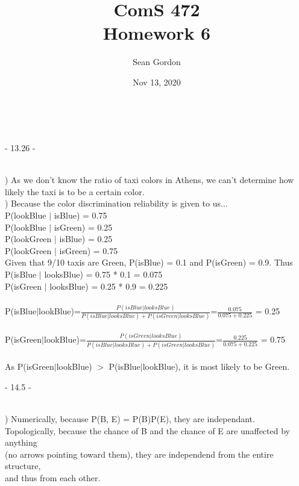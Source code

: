 \documentclass[12pt]{article}
\title{ComS 472\\Homework 6}
\author{Sean Gordon}
\date{Nov 13, 2020}
\begin{document}
\maketitle

\ \\
\centerline{- 13.26 - }
\ \\
) As we don't know the ratio of taxi colors in Athens, we can't determine how likely the taxi is to be a certain color.\\

) Because the color discrimination reliability is given to us...\\
\indent P(lookBlue $|$ isBlue) = 0.75\\
\indent P(lookBlue $|$ isGreen) = 0.25\\
\indent P(lookGreen $|$ isBlue) = 0.25\\
\indent P(lookGreen $|$ isGreen) = 0.75\\[0.4em]
\indent Given that 9/10 taxis are Green, P(isBlue) = 0.1 and P(isGreen) = 0.9. Thus\\[.4em]
\indent P(isBlue $|$ looksBlue) = 0.75 * 0.1 = 0.075\\
\indent P(isGreen $|$ looksBlue) = 0.25 * 0.9 = 0.225\\\\
\indent P(isBlue$|$lookBlue)={\Large $\frac{P(isBlue | looksBlue)}{P(isBlue | looksBlue) +  P(isGreen | looksBlue)}$}={\Large $\frac{0.075}{0.075 + 0.225}$} = 0.25\\\\
\indent P(isGreen$|$lookBlue)={\Large $\frac{P(isGreen | looksBlue)}{P(isBlue | looksBlue) +  P(isGreen | looksBlue)}$}={\Large $\frac{0.225}{0.075 + 0.225}$} = 0.75\\\\
\indent As P(isGreen$|$lookBlue) $>$ P(isBlue$|$lookBlue), it is most likely to be Green.\\



\noindent \hrulefill \pagebreak



\centerline{- 14.5 - }
\ \\
) Numerically, because P(B, E) = P(B)P(E), they are independant.\\[.4em]
\indent Topologically, because the chance of B and the chance of E are unaffected by anything \\
\indent (no arrows pointing toward them), they are independend from the entire structure, \\
\indent and thus from each other.\\
\end{document}

